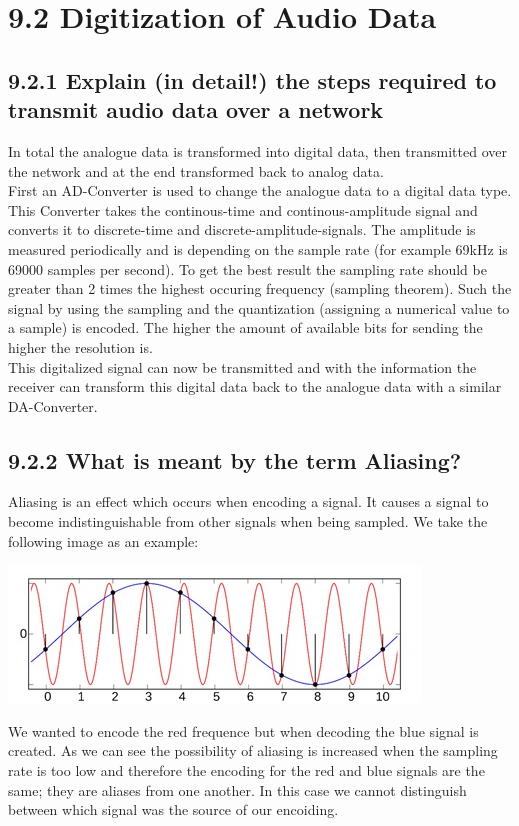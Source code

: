 \documentclass{article}
\begin{document}
	\section*{9.2 Digitization of Audio Data}
	\begin{adjustwidth}{2em}{2em}
		\subsection*{9.2.1 Explain (in detail!) the steps required to transmit audio data over a network}
		\begin{adjustwidth}{2em}{2em}
			In total the analogue data is transformed into digital data, then transmitted over the network and at the end transformed back to analog data. \\
			First an AD-Converter is used to change the analogue data to a digital data type. This Converter takes the continous-time and continous-amplitude signal and converts it to discrete-time and discrete-amplitude-signals. The amplitude is measured periodically and is depending on the sample rate (for example 69kHz is 69000 samples per second). To get the best result the sampling rate should be greater than 2 times the highest occuring frequency (sampling theorem). Such the signal by using the sampling and the quantization (assigning a numerical value to a sample) is encoded. The higher the amount of available bits for sending the higher the resolution is. \\
			This digitalized signal can now be transmitted and with the information the receiver can transform this digital data back to the analogue data with a similar DA-Converter.
		\end{adjustwidth}
		\subsection*{9.2.2 What is meant by the term Aliasing?}
		\begin{adjustwidth}{2em}{2em}
			Aliasing is an effect which occurs when encoding a signal. It causes a signal to become indistinguishable from other signals when being sampled. We take the following image as an example:
			\begin{center}
			\includegraphics[scale=0.6]{Aliasing.jpg}			
			\end{center}
			We wanted to encode the red frequence but when decoding the blue signal is created. As we can see the possibility of aliasing is increased when the sampling rate is too low and therefore the encoding for the red and blue signals are the same; they are aliases from one another. In this case we cannot distinguish between which signal was the source of our encoiding.
		\end{adjustwidth}

\end{adjustwidth}
\end{document}
